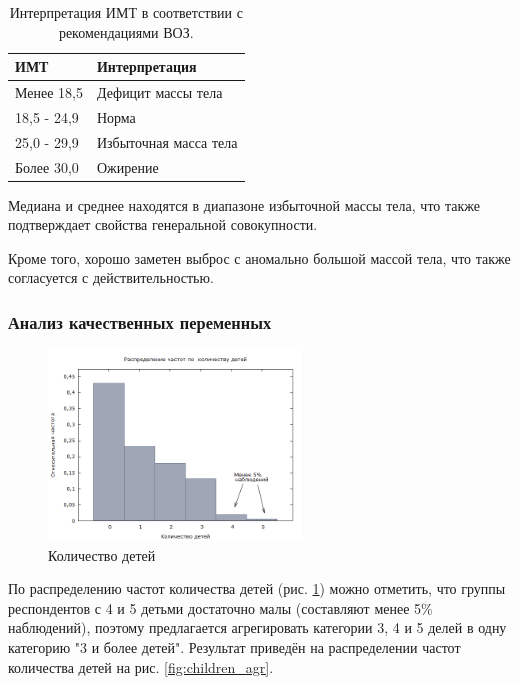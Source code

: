 \documentclass[a4paper,12pt]{article}
\begin{document}
\begin{table}[H]
	\begin{center}
		\begin{tabular}{ | l | l |}
			\hline
			ИМТ & Интерпретация \\ \hline
			Менее 18,5 & Дефицит массы тела \\ \hline
			18,5 - 24,9 & Норма \\ \hline
			25,0 - 29,9 & Избыточная масса тела \\ \hline
			Более 30,0 & Ожирение \\ \hline
		\end{tabular}
	\end{center}
	\caption{Интерпретация ИМТ в соответствии с рекомендациями ВОЗ.}
	\label{tab:bmi}
\end{table}

Медиана и среднее находятся в диапазоне избыточной массы тела, что также подтверждает свойства генеральной совокупности.

Кроме того, хорошо заметен выброс с аномально большой массой тела, что также согласуется с действительностью.

\subsubsection{Анализ качественных переменных}

\begin{figure}[H]
	\includegraphics[width=0.6\textwidth]{../[graphics]/children.png}
	\centering
	\caption{Количество детей}
	\label{fig:children}
\end{figure}

По распределению частот количества детей (рис. \ref{fig:children}) можно отметить, что группы респондентов с 4 и 5 детьми достаточно малы (составляют менее 5\% наблюдений), поэтому предлагается агрегировать категории 3, 4 и 5 делей в одну категорию "3 и более детей". Результат приведён на распределении частот количества детей на рис. \ref{fig:children_agr}.
\end{document}
